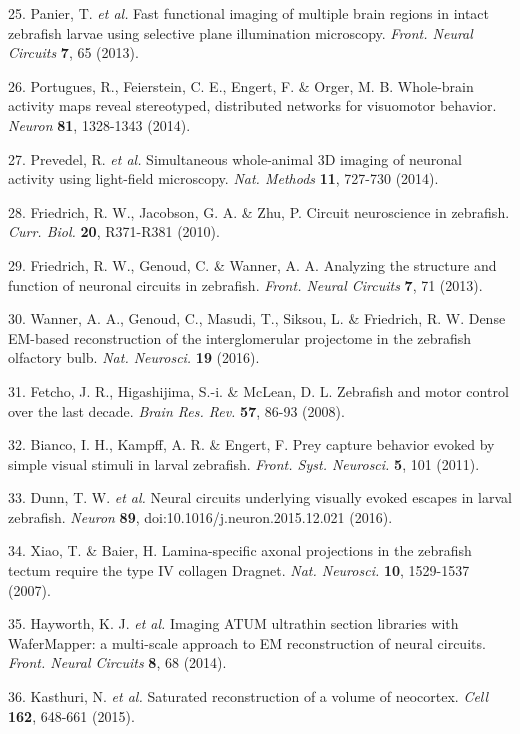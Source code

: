 \documentclass{article}
\begin{document}
\begin{hangpars}
25. Panier, T.\textit{ et al.} Fast functional imaging of multiple brain regions in intact zebrafish larvae using selective plane illumination microscopy. \textit{Front. Neural Circuits} \textbf{7}, 65 (2013).

26. Portugues, R., Feierstein, C. E., Engert, F. \& Orger, M. B. Whole-brain activity maps reveal stereotyped, distributed networks for visuomotor behavior. \textit{Neuron} \textbf{81}, 1328-1343 (2014).

27. Prevedel, R.\textit{ et al.} Simultaneous whole-animal 3D imaging of neuronal activity using light-field microscopy. \textit{Nat. Methods} \textbf{11}, 727-730 (2014).

28. Friedrich, R. W., Jacobson, G. A. \& Zhu, P. Circuit neuroscience in zebrafish. \textit{Curr. Biol.} \textbf{20}, R371-R381 (2010).

29. Friedrich, R. W., Genoud, C. \& Wanner, A. A. Analyzing the structure and function of neuronal circuits in zebrafish. \textit{Front. Neural Circuits} \textbf{7}, 71 (2013).

30. Wanner, A. A., Genoud, C., Masudi, T., Siksou, L. \& Friedrich, R. W. Dense EM-based reconstruction of the interglomerular projectome in the zebrafish olfactory bulb. \textit{Nat. Neurosci.} \textbf{19} (2016).

31. Fetcho, J. R., Higashijima, S.-i. \& McLean, D. L. Zebrafish and motor control over the last decade. \textit{Brain Res. Rev.} \textbf{57}, 86-93 (2008).

32. Bianco, I. H., Kampff, A. R. \& Engert, F. Prey capture behavior evoked by simple visual stimuli in larval zebrafish. \textit{Front. Syst. Neurosci.} \textbf{5}, 101 (2011).

33. Dunn, T. W.\textit{ et al.} Neural circuits underlying visually evoked escapes in larval zebrafish. \textit{Neuron} \textbf{89}, doi:10.1016/j.neuron.2015.12.021 (2016).

34. Xiao, T. \& Baier, H. Lamina-specific axonal projections in the zebrafish tectum require the type IV collagen Dragnet. \textit{Nat. Neurosci.} \textbf{10}, 1529-1537 (2007).

35. Hayworth, K. J.\textit{ et al.} Imaging ATUM ultrathin section libraries with WaferMapper: a multi-scale approach to EM reconstruction of neural circuits. \textit{Front. Neural Circuits} \textbf{8}, 68 (2014).

36. Kasthuri, N.\textit{ et al.} Saturated reconstruction of a volume of neocortex. \textit{Cell} \textbf{162}, 648-661 (2015).


\end{hangpars}
\end{document}
